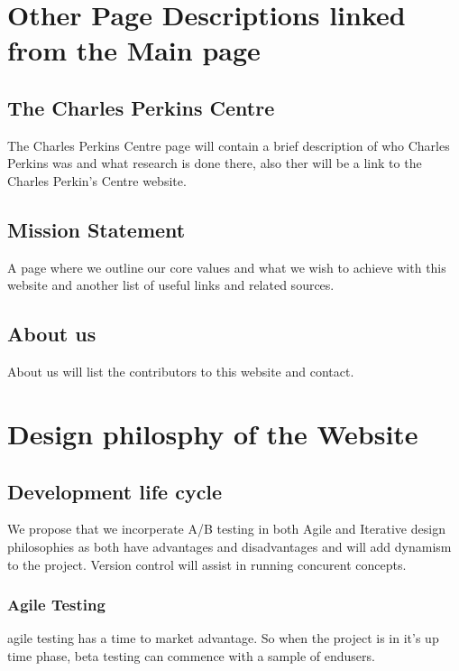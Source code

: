\documentclass[letterpaper,12pt]{article}
\begin{document}
\section{Other Page Descriptions linked from the Main page}

\subsection{The Charles Perkins Centre}

The Charles Perkins Centre page will contain a brief description of who Charles Perkins was and what research is done there, also ther will be a link to the Charles Perkin's Centre website.

\subsection{Mission Statement} 

A page where we outline our core values and what we wish to achieve with this website and another list of useful links and related sources.


\subsection{About us}

About us will list the contributors to this website and contact.

\section{Design philosphy of the Website}

\subsection{Development life cycle}

We propose that we incorperate A/B testing in both Agile and Iterative design philosophies as both have advantages and disadvantages and will add dynamism to the project. Version control will assist in running concurent concepts. 

\subsubsection{Agile Testing}

\Gls{agile} testing has a time to market advantage. So when the project is in it's up time phase, beta testing can commence with a sample of endusers.
\end{document}
